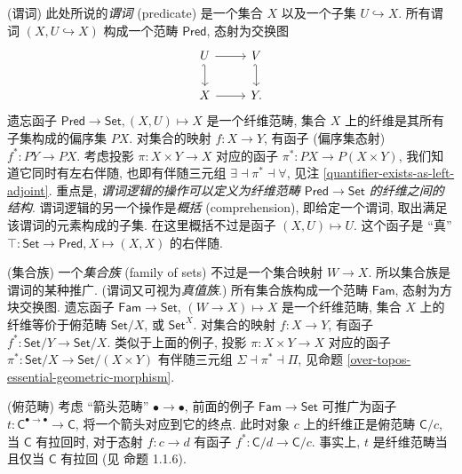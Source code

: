 \begin{example}
	{(谓词)}
	此处所说的\emph{谓词} (predicate) 是一个集合 $X$ 以及一个子集 $U\hookrightarrow X$. 所有谓词 $(X,U\hookrightarrow X)$ 构成一个范畴 $\mathsf{Pred}$, 态射为交换图
	\[\begin{tikzcd}[ampersand replacement=\&]
		U \& V \\
		X \& Y.
		\arrow[hook', from=1-1, to=2-1]
		\arrow[from=2-1, to=2-2]
		\arrow[from=1-1, to=1-2]
		\arrow[hook', from=1-2, to=2-2]
	\end{tikzcd}\]
	遗忘函子 $\mathsf {Pred}\to\mathsf {Set}, (X,U)\mapsto X$ 是一个纤维范畴, 集合 $X$ 上的纤维是其所有子集构成的偏序集 $PX$. 对集合的映射 $f\colon X\to Y$, 有函子 (偏序集态射) $f^*\colon PY\to PX$.
	考虑投影 $\pi\colon X\times Y\to X$ 对应的函子 $\pi^*\colon PX\to P(X\times Y)$, 我们知道它同时有左右伴随, 也即有伴随三元组 $\exists\dashv \pi^*\dashv \forall$, 见注 \ref{quantifier-exists-as-left-adjoint}.
	重点是, \emph{谓词逻辑的操作可以定义为纤维范畴 $\mathsf {Pred}\to\mathsf {Set}$ 的纤维之间的结构}.
	谓词逻辑的另一个操作是\emph{概括} (comprehension), 即给定一个谓词, 取出满足该谓词的元素构成的子集. 在这里概括不过是函子 $(X,U)\mapsto U$. 这个函子是 ``真'' $\top\colon \mathsf {Set}\to\mathsf {Pred},X\mapsto (X,X)$ 的右伴随.
\end{example}

\begin{example}
	[label={family-of-sets-fibration}]
	{(集合族)}
	一个\emph{集合族} (family of sets) 不过是一个集合映射 $W\to X$. 所以集合族是谓词的某种推广. (谓词又可视为\emph{真值族}.) 所有集合族构成一个范畴 $\mathsf {Fam}$, 态射为方块交换图. 遗忘函子 $\mathsf {Fam}\to\mathsf {Set}$, $(W\to X)\mapsto X$ 是一个纤维范畴, 集合 $X$ 上的纤维等价于俯范畴 $\mathsf {Set}/X$, 或 $\mathsf {Set}^X$. 对集合的映射 $f\colon X\to Y$, 有函子 $f^*\colon \mathsf {Set}/Y\to \mathsf {Set}/X$. 类似于上面的例子, 投影 $\pi\colon X\times Y\to X$ 对应的函子 $\pi^*\colon\mathsf {Set}/X\to \mathsf {Set}/{(X\times Y)}$ 有伴随三元组 $\Sigma\dashv\pi^*\dashv \Pi$, 见命题 \ref{over-topos-essential-geometric-morphism}. 
\end{example}

\begin{example}
	{(俯范畴)}
	考虑 ``箭头范畴'' $\bullet\longrightarrow\bullet$,
	前面的例子 $\mathsf {Fam}\to\mathsf {Set}$ 可推广为函子 $t\colon \mathsf C^{\bullet\longrightarrow\bullet}\to\mathsf C$, 将一个箭头对应到它的终点. 此时对象 $c$ 上的纤维正是俯范畴 $\mathsf C/c$, 当 $\mathsf C$ 有拉回时, 对于态射 $f\colon c\to d$ 有函子 $f^*\colon \mathsf C/d \to \mathsf C/c$. 事实上, $t$ 是纤维范畴当且仅当 $\mathsf C$ 有拉回 (见 \cite{CLTT} 命题 1.1.6).
\end{example}


